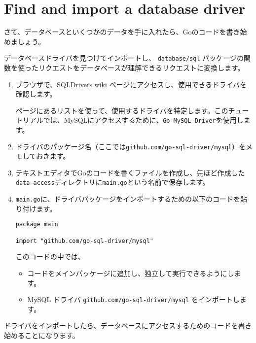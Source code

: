 \section{Find and import a database driver}

さて、データベースといくつかのデータを手に入れたら、Goのコードを書き始めましょう。

データベースドライバを見つけてインポートし、 \texttt{database/sql} パッケージの関数を使ったリクエストをデータベースが理解できるリクエストに変換します。

\begin{enumerate}
\item ブラウザで、SQLDrivers wiki ページにアクセスし、使用できるドライバを確認します。

ページにあるリストを使って、使用するドライバを特定します。このチュートリアルでは、MySQLにアクセスするために、\texttt{Go-MySQL-Driver}を使用します。

\item ドライバのパッケージ名（ここでは\texttt{github.com/go-sql-driver/mysql}）をメモしておきます。

\item テキストエディタでGoのコードを書くファイルを作成し、先ほど作成した\texttt{data-access}ディレクトリに\texttt{main.go}という名前で保存します。

\item \texttt{main.go}に、ドライバパッケージをインポートするための以下のコードを貼り付けます。
\begin{lstlisting}[numbers=none]
package main

import "github.com/go-sql-driver/mysql"
\end{lstlisting}

このコードの中では、
\begin{itemize}
\item コードをメインパッケージに追加し、独立して実行できるようにします。

\item MySQL ドライバ \texttt{github.com/go-sql-driver/mysql} をインポートします。
\end{itemize}

\end{enumerate}

ドライバをインポートしたら、データベースにアクセスするためのコードを書き始めることになります。
